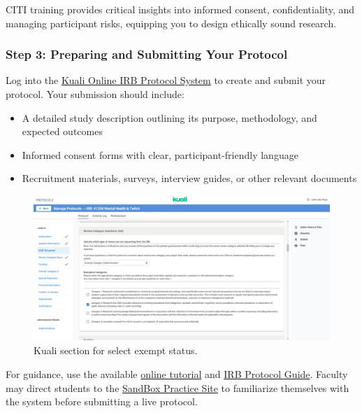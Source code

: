 \documentclass[
]{book}
\providecommand{\tightlist}{%
  \setlength{\itemsep}{0pt}\setlength{\parskip}{0pt}}
\begin{document}
CITI training provides critical insights into informed consent, confidentiality, and managing participant risks, equipping you to design ethically sound research.

\subsubsection*{Step 3: Preparing and Submitting Your Protocol}\label{step-3-preparing-and-submitting-your-protocol}

Log into the \href{https://siue.kuali.co/protocols}{Kuali Online IRB Protocol System} to create and submit your protocol. Your submission should include:

\begin{itemize}
\tightlist
\item
  A detailed study description outlining its purpose, methodology, and expected outcomes
\item
  Informed consent forms with clear, participant-friendly language
\item
  Recruitment materials, surveys, interview guides, or other relevant documents
\end{itemize}

\begin{figure}
\centering
\includegraphics[width=1\linewidth,height=\textheight,keepaspectratio]{images/kuali-exempt.png}
\caption{Kuali section for select exempt status.}
\end{figure}

For guidance, use the available \href{https://www.siue.edu/its/training/KRProtocols/story_html5.html}{online tutorial} and \href{https://www.siue.edu/compliance/human-subjects/pdf/IRBProtocolGuidance.pdf}{IRB Protocol Guide}. Faculty may direct students to the \href{https://siue-sbx.kuali.co/protocols}{SandBox Practice Site} to familiarize themselves with the system before submitting a live protocol.
\end{document}
